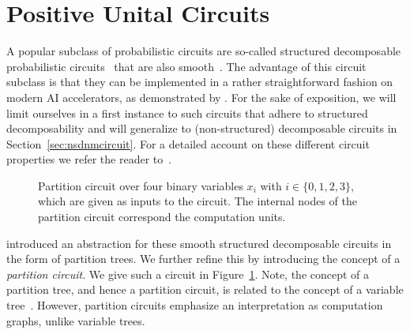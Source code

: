 
























\section{Positive Unital Circuits}
\label{sec:puncs}



A popular subclass of probabilistic circuits are so-called structured decomposable  probabilistic circuits~\citep{darwiche2011sdd} that are also smooth~\citep{darwiche2001tractable}. The advantage of this circuit subclass is that they can be implemented in a rather straightforward fashion on modern AI accelerators, as demonstrated by \citet{peharz2019random,peharz2020einsum}.
For the sake of exposition, we will limit ourselves in a first instance to such circuits that adhere to structured decomposability and will generalize to (non-structured) decomposable circuits in Section~\ref{sec:nsdnmcircuit}. For a detailed account on these different circuit properties we refer the reader to~\citep{vergari2021compositional}.

\begin{figure}[t]
	\centering
	

	\caption{
		Partition circuit over four binary variables $x_i$ with $i \in \{0,1,2,3\}$, which are given as inputs to the circuit. The internal nodes of the partition circuit correspond the computation units.}
	\label{fig:circuit}
\end{figure}


\citet{zuidberg2024probabilistic} introduced an abstraction for these smooth structured decomposable circuits in the form of partition trees.
We further refine this by introducing the concept of a \textit{partition circuit}.
We give such a circuit in Figure~\ref{fig:circuit}.
Note, the concept of a partition tree, and hence a partition circuit, is related to the concept of a variable tree~\citep{pipatsrisawat2008new}. However, partition circuits emphasize an interpretation as computation graphs, unlike variable trees.



